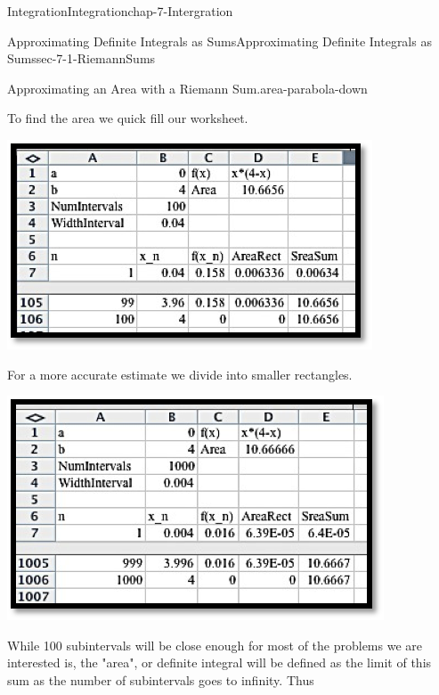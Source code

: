 \documentclass[oneside,10pt,]{book}
\numberwithin{equation}{section}
\begin{document}
\begin{chapterptx}{Integration}{}{Integration}{}{}{chap-7-Intergration}
\begin{sectionptx}{Approximating Definite Integrals as Sums}{}{Approximating Definite Integrals as Sums}{}{}{sec-7-1-RiemannSums}
\begin{example}{Approximating an Area with a Riemann Sum.}{area-parabola-down}
\par
\hypertarget{p-2559}{}%
To find the area we quick fill our worksheet.%
\begin{sidebyside}{1}{0.25}{0.25}{0}%
\begin{sbspanel}{0.5}%
\includegraphics[width=1\linewidth]{images/sec7-1-10.png}
\end{sbspanel}%
\end{sidebyside}%
\par
\hypertarget{p-2560}{}%
For a more accurate estimate we divide into smaller rectangles.%
\begin{sidebyside}{1}{0.25}{0.25}{0}%
\begin{sbspanel}{0.5}%
\includegraphics[width=1\linewidth]{images/sec7-1-11.png}
\end{sbspanel}%
\end{sidebyside}%
\end{example}
\hypertarget{p-2561}{}%
While 100 subintervals will be close enough for most of the problems we are interested is, the "area", or definite integral will be defined as the limit of this sum as the number of subintervals goes to infinity.  Thus%

\end{sectionptx}
\end{chapterptx}
\end{document}
